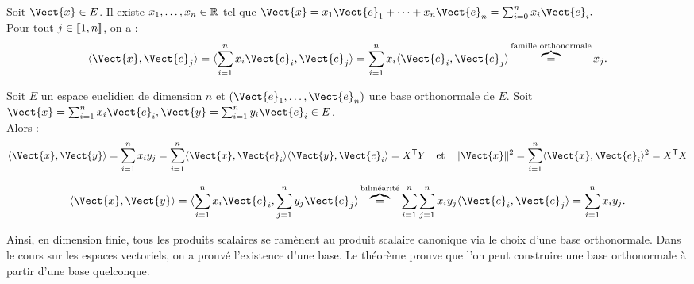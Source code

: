 \documentclass{book}
\begin{document}
\begin{Demonstration}
Soit $\Vect{x}\in E$. Il existe $x_1,\dots,x_n\in\mathbb{R}$ tel que $\Vect{x}= x_1 \Vect{e}_1+\dots+x_n\Vect{e}_n=\sum_{i=0}^n x_i\Vect{e}_i.$\\
Pour tout $j\in \mathopen\lbrack\!\lbrack1,n \mathclose\rbrack\!\rbrack$, on a :
$$\PS{\Vect{x}}{\Vect{e}_j} = \PS{\sum_{i=1}^nx_i\Vect{e}_i}{\Vect{e}_j}=\sum_{i=1}^nx_i\PS{\Vect{e}_i}{\Vect{e}_j}\overbrace{=}^{\text{famille orthonormale}}x_j.$$ 
\end{Demonstration} 
\begin{Proposition}
Soit $E$ un espace euclidien de dimension $n$ et $(\Vect{e}_1,\dots,\Vect{e}_n)$ une base orthonormale de $E$.
Soit $\Vect{x}= \sum_{i=1}^n x_i \Vect{e}_i,\Vect{y}=\sum_{i=1}^n y_i \Vect{e}_i\in E$.\\
Alors :
$$\PS{\Vect{x}}{\Vect{y}}=\sum_{i=1}^n x_iy_j=\sum_{i=1}^n \PS{\Vect{x}}{\Vect{e}_i}\PS{\Vect{y}}{\Vect{e}_i}=   \transposee {X}Y\quad \text{et}\quad \norme{\Vect{x}}^2=\sum_{i=1}^n \PS{\Vect{x}}{\Vect{e}_i}^2 =\transposee {X}X$$
\end{Proposition} 
\begin{Demonstration}
$$\PS{\Vect{x}}{\Vect{y}} = \PS{\sum_{i=1}^n x_i \Vect{e}_i }{\sum_{j=1}^n y_j \Vect{e}_j}\overbrace{=}^{\text{bilinéarité}}\sum_{i=1}^n\sum_{j=1}^n x_i y_j\PS{  \Vect{e}_i }{ \Vect{e}_j}=\sum_{i=1}^n x_iy_j. $$
\end{Demonstration}
Ainsi, en dimension finie, tous les produits scalaires se ramènent au produit scalaire canonique via le choix d'une base orthonormale. Dans le cours sur les espaces vectoriels, on a prouvé l'existence d'une base. Le théorème prouve que l'on peut construire une base orthonormale à partir d'une base quelconque.  
\end{document}
